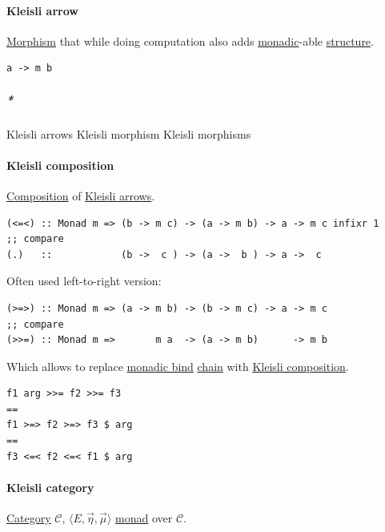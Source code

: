 \documentclass[a4paper,14pt,oneside]{book}
\begin{document}
\paragraph{\label{org13dd673}Kleisli arrow}
\label{sec:org7c217ca}
\hyperref[orga4a625f]{Morphism} that while doing computation also adds \hyperref[orgad2d5da]{monadic}-able \hyperref[orgeede468]{structure}.

\begin{verbatim}
a -> m b
\end{verbatim}

\subparagraph{\emph{*}}
\label{sec:orgaf12bc5}

\label{org2c573c5}Kleisli arrows
\label{orga997b26}Kleisli morphism
\label{orgc83eeaa}Kleisli morphisms

\paragraph{\label{orgdca4ef9}Kleisli composition}
\label{sec:org98bc5c6}
\hyperref[org3b0594f]{Composition} of \hyperref[org2c573c5]{Kleisli arrows}.

\begin{verbatim}
(<=<) :: Monad m => (b -> m c) -> (a -> m b) -> a -> m c infixr 1
;; compare
(.)   ::            (b ->  c ) -> (a ->  b ) -> a ->  c
\end{verbatim}

Often used left-to-right version:

\begin{verbatim}
(>=>) :: Monad m => (a -> m b) -> (b -> m c) -> a -> m c
;; compare
(>>=) :: Monad m =>       m a  -> (a -> m b)      -> m b
\end{verbatim}

Which allows to replace \hyperref[orgd7dfd06]{monadic bind} \hyperref[org3b5ce40]{chain} with \hyperref[orgdca4ef9]{Kleisli composition}.

\begin{verbatim}
f1 arg >>= f2 >>= f3
==
f1 >=> f2 >=> f3 $ arg
==
f3 <=< f2 <=< f1 $ arg
\end{verbatim}

\paragraph{\label{org1dfabfe}Kleisli category}
\label{sec:org1277bae}
\hyperref[org9e8ed33]{Category} \(\mathcal{C}\), \(〈E, \overrightarrow{\eta}, \overrightarrow{\mu}〉\) \hyperref[orgec3710d]{monad} over \(\mathcal{C}\).
\end{document}
